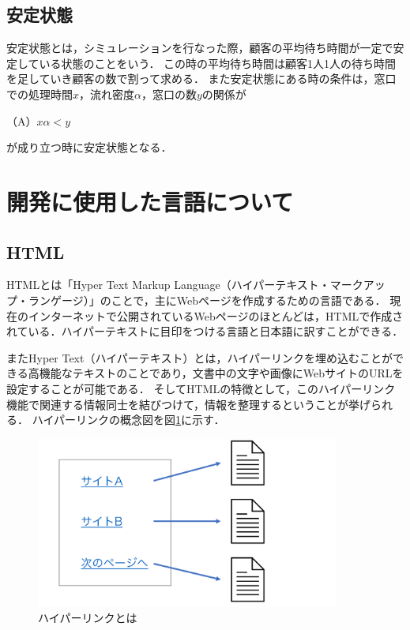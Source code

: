 \documentclass[12pt,a4j]{ltjsarticle}
\begin{document}
\subsection{安定状態}
安定状態とは，シミュレーションを行なった際，顧客の平均待ち時間が一定で安定している状態のことをいう．
この時の平均待ち時間は顧客1人1人の待ち時間を足していき顧客の数で割って求める．
また安定状態にある時の条件は，窓口での処理時間$x$，流れ密度$\alpha$，窓口の数$y$の関係が

（A）$x\alpha < y$

\noindent
が成り立つ時に安定状態となる．
\clearpage

\section{開発に使用した言語について}
\subsection{HTML}
HTMLとは「Hyper Text Markup Language（ハイパーテキスト・マークアップ・ランゲージ）」のことで，主にWebページを作成するための言語である\cite{html}．
現在のインターネットで公開されているWebページのほとんどは，HTMLで作成されている．ハイパーテキストに目印をつける言語と日本語に訳すことができる．

またHyper Text（ハイパーテキスト）とは，ハイパーリンクを埋め込むことができる高機能なテキストのことであり，文書中の文字や画像にWebサイトのURLを設定することが可能である．
そしてHTMLの特徴として，このハイパーリンク機能で関連する情報同士を結びつけて，情報を整理するということが挙げられる．
ハイパーリンクの概念図を図\ref{fig:hyper}に示す．
\begin{figure}[h]
\begin{center}
\includegraphics[width = 100mm ] {figures/hyperlink.pdf}
\caption{ハイパーリンクとは}
\label{fig:hyper}
\end{center}
\end{figure}
\end{document}
